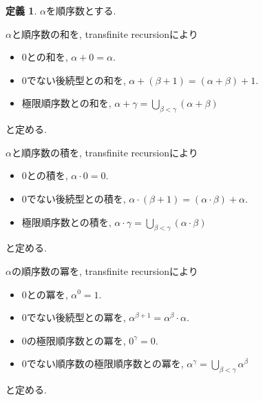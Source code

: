 \documentclass[a4paper, twoside]{bxjsarticle}
\theoremstyle{definition}
\newtheorem{defn}[thm]{定義}
\begin{document}
        \begin{defn}
            $\alpha$を順序数とする. 
            
            $\alpha$と順序数の和を, transfinite recursionにより
            \begin{itemize}
                \item 0との和を, $\alpha + 0 = \alpha$.
                \item 0でない後続型との和を, $\alpha + (\beta+1) = (\alpha+\beta)+1$.
                \item 極限順序数との和を, $\alpha + \gamma = \bigcup_{\beta<\gamma}(\alpha+\beta)$
            \end{itemize}
            と定める.
            
            $\alpha$と順序数の積を, transfinite recursionにより
            \begin{itemize}
                \item 0との積を, $\alpha \cdot 0 = 0$.
                \item 0でない後続型との積を, $\alpha \cdot (\beta+1) = (\alpha\cdot\beta)+\alpha$.
                \item 極限順序数との積を, $\alpha \cdot \gamma = \bigcup_{\beta<\gamma}(\alpha\cdot\beta)$
            \end{itemize}
            と定める.
            
            $\alpha$の順序数の冪を, transfinite recursionにより
            \begin{itemize}
                \item 0との冪を, $\alpha^0 = 1$.
                \item 0でない後続型との冪を, $\alpha^{\beta+1} = \alpha^\beta\cdot\alpha$.
                \item 0の極限順序数との冪を, $0^\gamma = 0$.
                \item 0でない順序数の極限順序数との冪を, $\alpha^\gamma = \bigcup_{\beta<\gamma}\alpha^\beta$
            \end{itemize}
            と定める.
        \end{defn}
        
\end{document}
